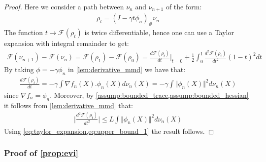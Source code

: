 \begin{proof}
	Here we consider a path between $\nu_n$ and $\nu_{n+1}$ of the form:
	\begin{align*}
	\rho_t	=(I-\gamma t\phi_n)_{\#}\nu_n
	\end{align*}
	The function $t\mapsto \mathcal{F}(\rho_t)$ is twice differentiable, hence one can use a Taylor expansion with integral remainder to get:
	\begin{align}\label{eq:taylor_expansion}
	\mathcal{F}(\nu_{n+1})-\mathcal{F}(\nu_{n})=\mathcal{F}(\rho_1)-\mathcal{F}(\rho_0) = \frac{d \mathcal{F}(\rho_t) }{dt}\vert_{t=0}+ \frac{1}{2} \int_0^1 \frac{d^2 \mathcal{F}(\rho_t)}{dt^2}(1-t)^2 dt 
	\end{align} 
	By taking $\phi=-\gamma \phi_n$ in \cref{lem:derivative_mmd} we have that:
	\begin{align*}
	\frac{d \mathcal{F}(\rho_t) }{dt} = -\gamma \int \nabla f_n(X).\phi_n(X)d\nu_n(X)=-\gamma \int \Vert \phi_n(X) \Vert^2 d\nu_n(X)
	\end{align*}
	since $\nabla f_n=\phi_n$.
	Moreover, by \cref{assump:bounded_trace,assump:bounded_hessian} it follows from \cref{lem:derivative_mmd} that:
	\begin{align}\label{eq:upper_bound_1}
	\vert \frac{d^2 \mathcal{F}(\rho_t) }{dt^2}   \vert\leq L\int \Vert \phi_n(X) \Vert^2 d\nu_n(X)
	\end{align}
	Using \cref{eq:taylor_expansion,eq:upper_bound_1} the result follows.
\end{proof}

\subsubsection{Proof of \cref{prop:evi}}

